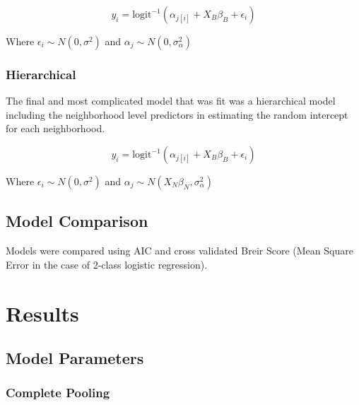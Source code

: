 \documentclass{report}
\begin{document}
$$ y_{i} = \text{logit}^{-1}\left( \alpha_{j[i]} + X_{B}\beta_{B} +  \epsilon_i \right) $$

Where $\epsilon_i \sim N(0, \sigma^2)$ and $\alpha_j \sim N(0, \sigma^2_\alpha)$

\subsubsection*{Hierarchical}

The final and most complicated model that was fit was a hierarchical model including the neighborhood level predictors in estimating the random intercept for each neighborhood. 

$$ y_{i} = \text{logit}^{-1}\left( \alpha_{j[i]} + X_{B}\beta_{B} +  \epsilon_i \right) $$

Where $\epsilon_i \sim N(0, \sigma^2)$ and $\alpha_j \sim N(X_N \beta_N, \sigma^2_\alpha)$


\subsection*{Model Comparison}

Models were compared using AIC and cross validated Breir Score (Mean Square Error in the case of 2-class logistic regression).



\section*{Results}

\subsection*{Model Parameters}

\subsubsection*{Complete Pooling}
\end{document}
